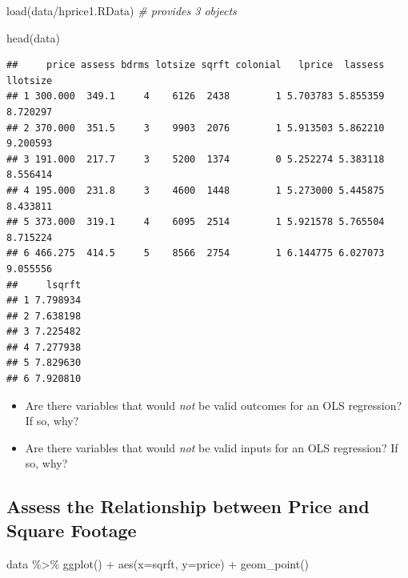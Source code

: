 \documentclass[
]{book}
\newenvironment{Shaded}{\begin{snugshade}}{\end{snugshade}}
\newcommand{\AttributeTok}[1]{\textcolor[rgb]{0.77,0.63,0.00}{#1}}
\newcommand{\CommentTok}[1]{\textcolor[rgb]{0.56,0.35,0.01}{\textit{#1}}}
\newcommand{\FunctionTok}[1]{\textcolor[rgb]{0.00,0.00,0.00}{#1}}
\newcommand{\NormalTok}[1]{#1}
\newcommand{\SpecialCharTok}[1]{\textcolor[rgb]{0.00,0.00,0.00}{#1}}
\newcommand{\StringTok}[1]{\textcolor[rgb]{0.31,0.60,0.02}{#1}}
\providecommand{\tightlist}{%
  \setlength{\itemsep}{0pt}\setlength{\parskip}{0pt}}
\theoremstyle{definition}
\theoremstyle{definition}
\theoremstyle{definition}
\theoremstyle{definition}
\theoremstyle{remark}
\begin{document}
\begin{Shaded}
\begin{Highlighting}[]
\FunctionTok{load}\NormalTok{(}\StringTok{\textquotesingle{}data/hprice1.RData\textquotesingle{}}\NormalTok{) }\CommentTok{\# provides 3 objects }
\end{Highlighting}
\end{Shaded}

\begin{Shaded}
\begin{Highlighting}[]
\FunctionTok{head}\NormalTok{(data)}
\end{Highlighting}
\end{Shaded}

\begin{verbatim}
##     price assess bdrms lotsize sqrft colonial   lprice  lassess llotsize
## 1 300.000  349.1     4    6126  2438        1 5.703783 5.855359 8.720297
## 2 370.000  351.5     3    9903  2076        1 5.913503 5.862210 9.200593
## 3 191.000  217.7     3    5200  1374        0 5.252274 5.383118 8.556414
## 4 195.000  231.8     3    4600  1448        1 5.273000 5.445875 8.433811
## 5 373.000  319.1     4    6095  2514        1 5.921578 5.765504 8.715224
## 6 466.275  414.5     5    8566  2754        1 6.144775 6.027073 9.055556
##     lsqrft
## 1 7.798934
## 2 7.638198
## 3 7.225482
## 4 7.277938
## 5 7.829630
## 6 7.920810
\end{verbatim}

\begin{itemize}
\tightlist
\item
  Are there variables that would \emph{not} be valid outcomes for an OLS regression? If so, why?
\item
  Are there variables that would \emph{not} be valid inputs for an OLS regression? If so, why?
\end{itemize}

\hypertarget{assess-the-relationship-between-price-and-square-footage}{%
\subsection{Assess the Relationship between Price and Square Footage}\label{assess-the-relationship-between-price-and-square-footage}}

\begin{Shaded}
\begin{Highlighting}[]
\NormalTok{data }\SpecialCharTok{\%\textgreater{}\%} 
  \FunctionTok{ggplot}\NormalTok{() }\SpecialCharTok{+} 
  \FunctionTok{aes}\NormalTok{(}\AttributeTok{x=}\NormalTok{sqrft, }\AttributeTok{y=}\NormalTok{price) }\SpecialCharTok{+} 
  \FunctionTok{geom\_point}\NormalTok{()}
\end{Highlighting}
\end{Shaded}
\end{document}
